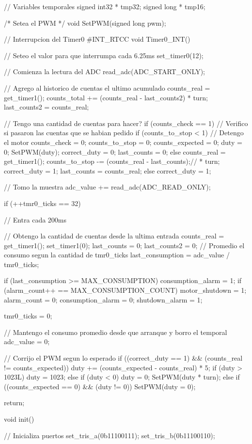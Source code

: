 \documentclass[a4paper,10pt]{article}
\begin{document}
{\begin{verbatimtab}
// Variables temporales
signed int32 * tmp32;
signed long * tmp16;

/* Setea el PWM */
void SetPWM(signed long pwm);

// Interrupcion del Timer0
#INT_RTCC
void Timer0_INT()
{
	// Seteo el valor para que interrumpa cada 6.25ms
	set_timer0(12);
	
	// Comienza la lectura del ADC
	read_adc(ADC_START_ONLY);
	
	// Agrego al historico de cuentas el ultimo acumulado
	counts_real = get_timer1();
	counts_total += (counts_real - last_counts2) * turn;
	last_counts2 = counts_real;
	
	// Tengo una cantidad de cuentas para hacer?
	if (counts_check == 1)
	{
		// Verifico si pasaron las cuentas que se habian pedido
		if (counts_to_stop < 1)
		{
			// Detengo el motor
			counts_check = 0;
			counts_to_stop = 0;
			counts_expected = 0;
			duty = 0;
			SetPWM(duty);
			correct_duty = 0;
			last_counts = 0;
		} else {
			counts_real = get_timer1();
			counts_to_stop -= (counts_real - last_counts);// * turn;
			correct_duty = 1;
			last_counts = counts_real;
		}
	} else {
		correct_duty = 1;
	}
	
	// Tomo la muestra
	adc_value += read_adc(ADC_READ_ONLY);
	
	if (++tmr0_ticks == 32)
	{
		// Entra cada 200ms

		// Obtengo la cantidad de cuentas desde la ultima entrada
		counts_real = get_timer1();
		set_timer1(0);
		last_counts = 0;
		last_counts2 = 0;
		// Promedio el consumo segun la cantidad de tmr0_ticks
		last_consumption = adc_value / tmr0_ticks;
		
		if (last_consumption >= MAX_CONSUMPTION)
		{
			consumption_alarm = 1;
			if (alarm_count++ == MAX_CONSUMPTION_COUNT)
			{
				motor_shutdown = 1;
				alarm_count = 0;
				consumption_alarm = 0;
				shutdown_alarm = 1;
			}	
		}
		
		tmr0_ticks = 0;

		// Mantengo el consumo promedio desde que arranque y borro el temporal
		adc_value = 0;

		// Corrijo el PWM segun lo esperado
		if ((correct_duty == 1) && (counts_real != counts_expected))
		{
			duty += (counts_expected - counts_real) * 5;
			if (duty > 1023L)
				duty = 1023;
			else if (duty < 0)
				duty = 0;
			SetPWM(duty * turn);
		} else if ((counts_expected == 0) && (duty != 0)) {		
			SetPWM(duty = 0);
		}	
	}
	return;
}

void init()
{
	// Inicializa puertos
	set_tris_a(0b11100111);
	set_tris_b(0b11100110);

}
\end{verbatimtab}}
\end{document}
